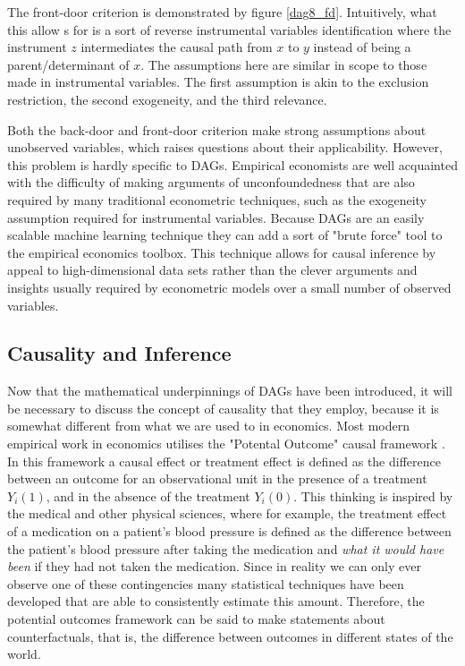 \documentclass{article}
\begin{document}
The front-door criterion is demonstrated by figure \ref{dag8_fd}. Intuitively, what this allow s for is a sort of reverse instrumental variables identification where the instrument $z$ intermediates the causal path from $x$ to $y$ instead of being a parent/determinant of $x$. The assumptions here are similar in scope to those made in instrumental variables. The first assumption is akin to the exclusion restriction, the second exogeneity, and the third relevance.

Both the back-door and front-door criterion make strong assumptions about unobserved variables, which raises questions about their applicability. However, this problem is hardly specific to DAGs. Empirical economists are well acquainted with the difficulty of making arguments of unconfoundedness that are also required by many traditional econometric techniques, such as the exogeneity assumption required for instrumental variables. Because DAGs are an easily scalable machine learning technique they can add a sort of "brute force" tool to the empirical economics toolbox. This technique allows for causal inference by appeal to high-dimensional data sets rather than the clever arguments and insights usually required by econometric models over a small number of observed variables.

\subsection{Causality and Inference}

Now that the mathematical underpinnings of DAGs have been introduced, it will be necessary to discuss the concept of causality that they employ, because it is somewhat different from what we are used to in economics. Most modern empirical work in economics utilises the "Potental Outcome" causal framework \parencite{holland1986statistics}. In this framework a causal effect or treatment effect is defined as the difference between an outcome for an observational unit in the presence of a treatment $Y_i(1)$, and in the absence of the treatment $Y_i(0)$. This thinking is inspired by the medical and other physical sciences, where for example, the treatment effect of a medication on a patient's blood pressure is defined as the difference between the patient's blood pressure after taking the medication and \textit{what it would have been} if they had not taken the medication. Since in reality we can only ever observe one of these contingencies many statistical techniques have been developed that are able to consistently estimate this amount. Therefore, the potential outcomes framework can be said to make statements about counterfactuals, that is, the difference between outcomes in different states of the world.
\end{document}
